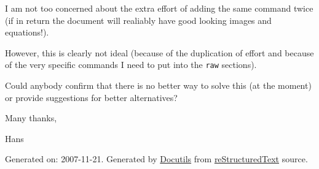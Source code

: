 \documentclass[10pt,a4paper,english]{article}
\begin{document}
%
I am not too concerned about the extra effort of adding the same
command twice (if in return the document will realiably have good
looking images and equations!).

However, this is clearly not ideal (because of the duplication of
effort and because of the very specific commands I need to put into
the \texttt{raw} sections).

Could anybody confirm that there is no better way to solve this (at
the moment) or provide suggestions for better alternatives?

Many thanks,

Hans

\begin{center}\small

Generated on: 2007-11-21.
Generated by \href{http://docutils.sourceforge.net/}{Docutils} from \href{http://docutils.sourceforge.net/rst.html}{reStructuredText} source.


\end{center}
\end{document}

